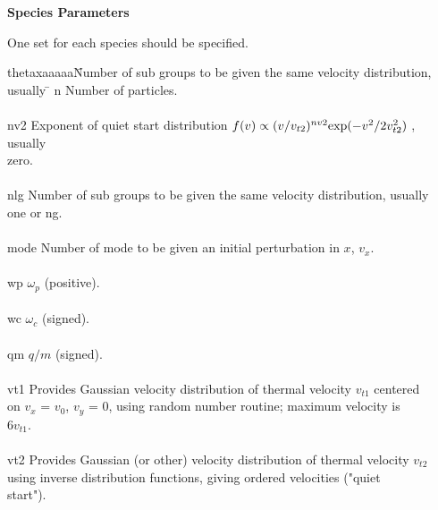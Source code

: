 \begin{section}
\begin{subsection}
\begin{subsubsection}
\end{subsubsection}

\begin{subsubsection}
{\bf Species Parameters}

      One set for each species should be specified.
\begin{tabbing}
      thetaxaaaaa\=Number of sub groups to be given the same velocity
                    distribution, usually \= \kill
      n           \>  Number of particles.\> \\
					\\
      nv2       \>    Exponent of quiet start distribution
		    $f(v) \propto(v/v_{t2})^{nv2}{\rm exp}(-v^{2}/2v_{t2}^{2})$
                    , usually \> \\
		\> zero. \> \\
								\\
      nlg       \>     Number of sub groups to be given the same velocity
                    distribution, usually \> \\ 
		\> one or ng. \> \\
							\\
      mode     \>      Number of mode to be given an initial perturbation in $x$,
                    $v_{x}$. \> \\
								\\
      wp      \>      $\omega_{p}$ (positive). \> \\
								\\
      wc      \>      $\omega_{c}$ (signed). \> \\
								\\
      qm      \>       $q / m$ (signed). \> \\
								\\
      vt1     \>      Provides Gaussian velocity distribution of thermal velocity
                    $v_{t1}$ centered \> \\
		\> on $v_{x}$ = $v_{0}$, $v_{y}$ = 0, 
		    using random number
                    routine; maximum velocity is \> \\ 
		\>  $6v_{t1}$. \> \\
								\\
      vt2       \>    Provides Gaussian (or other) velocity distribution of
                    thermal velocity $v_{t2}$ \> \\
		\>  using inverse 
		    distribution functions,
                    giving ordered velocities ("quiet \> \\
		\> start"). \> \\

\end{tabbing}
\end{subsubsection}
\end{subsection}
\end{section}
